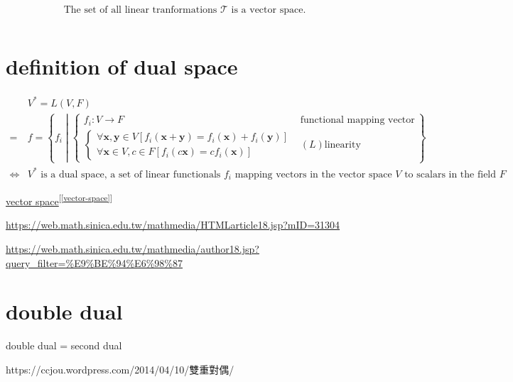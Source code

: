 \documentclass[
]{book}
\theoremstyle{definition}
\theoremstyle{definition}
\theoremstyle{definition}
\theoremstyle{definition}
\theoremstyle{remark}
\begin{document}
\[
\text{The set of all linear tranformations } \mathcal{T} \text{ is a vector space.}
\]

\[
\ \tag*{$\Box$}
\]

\hypertarget{definition-of-dual-space}{%
\section{definition of dual space}\label{definition-of-dual-space}}

\[
\begin{aligned}
 & V^{*}=L\left(V,F\right)\\
= & f=\left\{ f_{{\scriptscriptstyle i}}\middle|\begin{cases}
f_{{\scriptscriptstyle i}}:V\rightarrow F & \text{functional mapping vector to field scalar}\\
\begin{cases}
\forall\boldsymbol{x},\boldsymbol{y}\in V\left[f_{{\scriptscriptstyle i}}\left(\boldsymbol{x}+\boldsymbol{y}\right)=f_{{\scriptscriptstyle i}}\left(\boldsymbol{x}\right)+f_{{\scriptscriptstyle i}}\left(\boldsymbol{y}\right)\right]\\
\forall\boldsymbol{x}\in V,c\in F\left[f_{{\scriptscriptstyle i}}\left(c\boldsymbol{x}\right)=cf_{{\scriptscriptstyle i}}\left(\boldsymbol{x}\right)\right]
\end{cases} & \left(L\right)\text{linearity}
\end{cases}\right\} \\
\Leftrightarrow & V^{*}\text{ is a dual space, a set of linear functionals }f_{{\scriptscriptstyle i}}\text{ mapping vectors in the vector space }V\text{ to scalars in the field }F
\end{aligned}
\]

\protect\hyperlink{vector-space}{vector space}\textsuperscript{{[}\ref{vector-space}{]}}

\url{https://web.math.sinica.edu.tw/mathmedia/HTMLarticle18.jsp?mID=31304}

\url{https://web.math.sinica.edu.tw/mathmedia/author18.jsp?query_filter=\%E9\%BE\%94\%E6\%98\%87}

\hypertarget{double-dual}{%
\section{double dual}\label{double-dual}}

double dual = second dual

\begin{CJK}{UTF8}{bsmi}
https://ccjou.wordpress.com/2014/04/10/雙重對偶/
\end{CJK}
\end{document}
